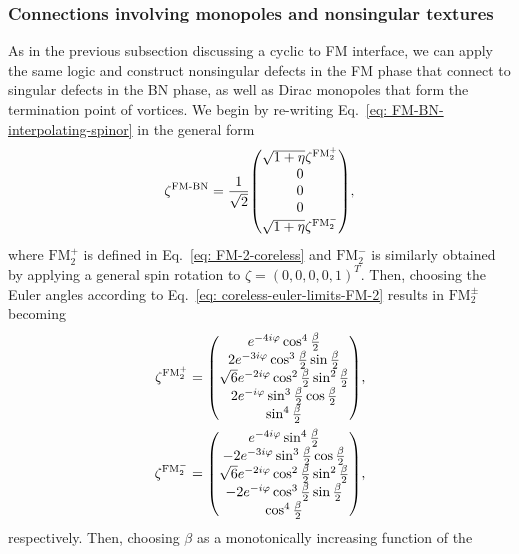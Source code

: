 \subsubsection{Connections involving monopoles and nonsingular textures}
As in the previous subsection discussing a cyclic to FM interface, we can apply
the same logic and construct nonsingular defects in the FM phase that connect to
singular defects in the BN phase, as well as Dirac monopoles that form the
termination point of vortices.
We begin by re-writing Eq.~\eqref{eq: FM-BN-interpolating-spinor} in the general
form
\begin{align}
    \zeta^\text{FM-BN} = \frac{1}{\sqrt{2}}\mqty(
        \sqrt{1+\eta}\zeta^{\text{FM}_2^+} \\
        0 \\
        0 \\
        0 \\
        \sqrt{1+\eta}\zeta^{\text{FM}_2^-}
    ),
\end{align}
where \(\text{FM}_2^+\) is defined in Eq.~\eqref{eq: FM-2-coreless} and
\(\text{FM}_2^-\) is similarly obtained by applying a general spin rotation
to \(\zeta={(0, 0, 0, 0, 1)}^T\).
Then, choosing the Euler angles according to
Eq.~\eqref{eq: coreless-euler-limits-FM-2} results in \(\text{FM}_2^\pm\)
becoming
\begin{align}
    \zeta^{\text{FM}_2^+} &=
    \mqty(
        e^{-4i\varphi} \cos^4 \frac{\beta}{2} \\
        2e^{-3i\varphi} \cos^3 \frac{\beta}{2} \sin \frac{\beta}{2} \\
        \sqrt{6}e^{-2i\varphi}\cos^2\frac{\beta}{2}\sin^2\frac{\beta}{2}\\
        2e^{-i\varphi} \sin^3 \frac{\beta}{2} \cos \frac{\beta}{2} \\
        \sin^4\frac{\beta}{2}
        \label{eq: FM-BN-dirac2}
    ), \\
    \zeta^{\text{FM}_{2}^-} &= 
    \mqty(
        e^{-4i\varphi} \sin^4 \frac{\beta}{2} \\
        -2e^{-3i\varphi} \sin^3 \frac{\beta}{2} \cos \frac{\beta}{2} \\
        \sqrt{6}e^{-2i\varphi}\cos^2\frac{\beta}{2}\sin^2\frac{\beta}{2}\\
        -2e^{-i\varphi} \cos^3 \frac{\beta}{2} \sin \frac{\beta}{2} \\
        \cos^4\frac{\beta}{2}
    ),
\end{align}
respectively.
Then, choosing \(\beta\) as a monotonically increasing function of the
